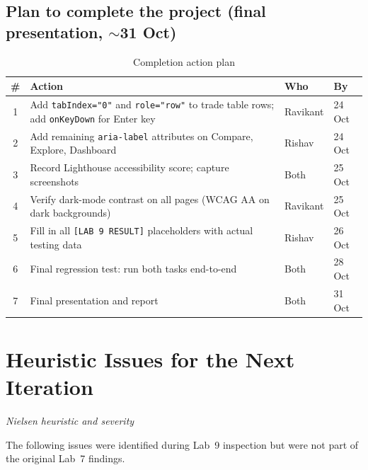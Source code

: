 \documentclass[10pt,a4paper]{article}
\begin{document}
\subsection{Plan to complete the project (final presentation, $\sim$31 Oct)}

\begin{table}[H]
\centering
\caption{Completion action plan}
\label{tab:plan}
\begin{tabularx}{\textwidth}{c X l l}
\toprule
\textbf{\#} & \textbf{Action} & \textbf{Who} & \textbf{By} \\
\midrule
1 & Add \texttt{tabIndex="0"} and \texttt{role="row"} to trade table rows; add \texttt{onKeyDown} for Enter key &
  Ravikant & 24 Oct \\
2 & Add remaining \texttt{aria-label} attributes on Compare, Explore, Dashboard &
  Rishav & 24 Oct \\
3 & Record Lighthouse accessibility score; capture screenshots &
  Both & 25 Oct \\
4 & Verify dark-mode contrast on all pages (WCAG AA on dark backgrounds) &
  Ravikant & 25 Oct \\
5 & Fill in all \texttt{[LAB 9 RESULT]} placeholders with actual testing data &
  Rishav & 26 Oct \\
6 & Final regression test: run both tasks end-to-end &
  Both & 28 Oct \\
7 & Final presentation and report &
  Both & 31 Oct \\
\bottomrule
\end{tabularx}
\end{table}


\section{Heuristic Issues for the Next Iteration}
\hfill\emph{Nielsen heuristic and severity}

The following issues were identified during Lab~9 inspection but were not part of the original Lab~7 findings.
\end{document}
